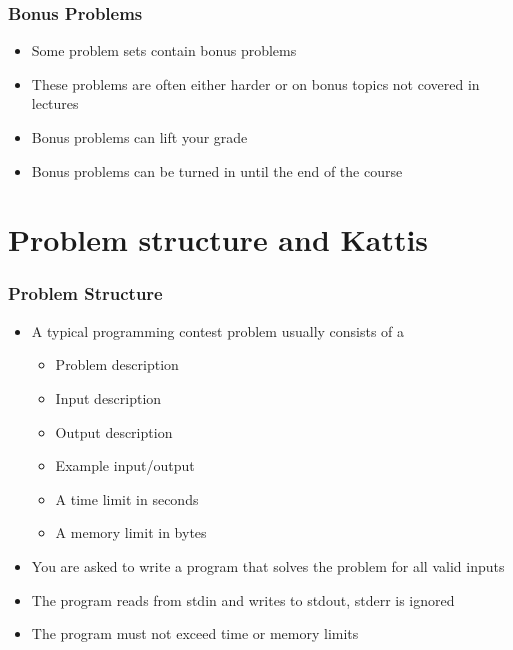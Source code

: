 \documentclass{beamer}
\begin{document}
\begin{frame}[plain]
	\frametitle{Bonus Problems}
	\begin{itemize}
		\item Some problem sets contain bonus problems
		\item These problems are often either harder or on bonus topics not covered in lectures
        \item Bonus problems can lift your grade
        \item Bonus problems can be turned in until the end of the course
	\end{itemize}
\end{frame}


\section*{Problem structure and Kattis}

\begin{frame}[plain]
	\frametitle{Problem Structure}
	\begin{itemize}
		\item A typical programming contest problem usually consists of a
        \begin{itemize} 
            \item Problem description
            \item Input description
            \item Output description
            \item Example input/output
            \item A time limit in seconds
            \item A memory limit in bytes
        \end{itemize}
        \item You are asked to write a program that solves the problem for all valid inputs
        \item The program reads from stdin and writes to stdout, stderr is ignored
        \item The program must not exceed time or memory limits
	\end{itemize}
\end{frame}
\end{document}
